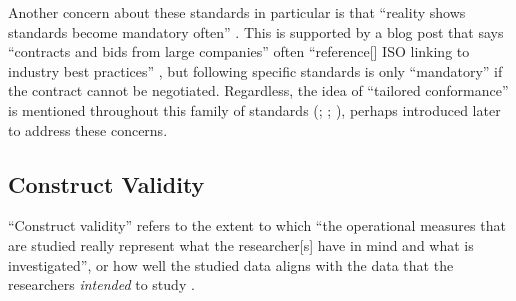 Another concern about these standards in particular is that ``reality shows
standards become mandatory often'' \citep{AST2014}. This is supported by a blog
post that says ``contracts and bids from large companies'' often ``reference[]
ISO linking to industry best practices'' \citep{Moolya2015}, but following
specific standards is only ``mandatory'' if the contract cannot be negotiated.
Regardless, the idea of ``tailored conformance'' is mentioned throughout this
family of standards (\citealp[pp.~9\=/10]{IEEE2021a};
\citeyear[pp.~5, 17, 37]{IEEE2021b}; \citeyear[p.~7]{IEEE2021c}), perhaps
introduced later to address these concerns.

\subsection{Construct Validity}\label{cons-valid}
``Construct validity'' refers to the extent to which ``the operational measures
that are studied really represent what the researcher[s] have in mind and what
is investigated'', or how well the studied data aligns with the data that the
researchers \emph{intended} to study \citep[p.~153]{RunesonAndHöst2009}.





